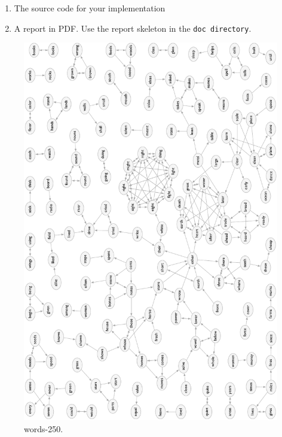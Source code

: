 \documentclass{tufte-handout}
\begin{document}
\begin{enumerate}
  \item The source code for your implementation
  \item A report in PDF.
  Use the report skeleton in the {\tt doc directory}.
  \end{enumerate}

\newpage
\begin{figure}
\includegraphics{words-250-layout.pdf}
\caption{words-250.}
\end{figure}
\end{document}
